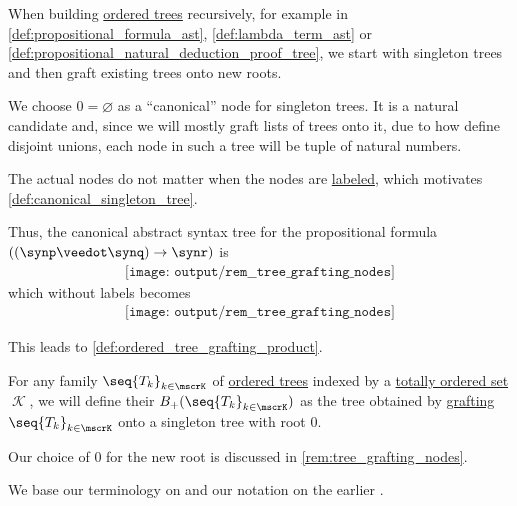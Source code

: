 \begin{remark}\label{rem:tree_grafting_nodes}
  When building \hyperref[def:ordered_tree]{ordered trees} recursively, for example in \cref{def:propositional_formula_ast}, \cref{def:lambda_term_ast} or \cref{def:propositional_natural_deduction_proof_tree}, we start with singleton trees and then graft existing trees onto new roots.

  We choose \( 0 = \varnothing \) as a \enquote{canonical} node for singleton trees. It is a natural candidate and, since we will mostly graft lists of trees onto it, due to how define disjoint unions, each node in such a tree will be tuple of natural numbers.

  The actual nodes do not matter when the nodes are \hyperref[def:labeled_set]{labeled}, which motivates \cref{def:canonical_singleton_tree}.

  Thus, the canonical abstract syntax tree for the propositional formula \( ((\synp \synvee \synq) \rightarrow \synr) \) is
  \begin{equation*}
    \begin{aligned}
      \texttt{[image: output/rem\_\_tree\_grafting\_nodes]}
    \end{aligned}
  \end{equation*}
  which without labels becomes
  \begin{equation*}
    \begin{aligned}
      \texttt{[image: output/rem\_\_tree\_grafting\_nodes]}
    \end{aligned}
  \end{equation*}

  This leads to \cref{def:ordered_tree_grafting_product}.
\end{remark}

\begin{definition}\label{def:ordered_tree_grafting_product}\mimprovised
  For any family \( \seq{ T_k }_{k \in \mscrK} \) of \hyperref[def:ordered_tree]{ordered trees} indexed by a \hyperref[def:totally_ordered_set]{totally ordered set} \( \mscrK \), we will define their  \( B_+(\seq{ T_k }_{k \in \mscrK}) \) as the tree obtained by \hyperref[def:ordered_tree_grafting]{grafting} \( \seq{ T_k }_{k \in \mscrK} \) onto a singleton tree with root \( 0 \).
\end{definition}
\begin{comments}
  \item Our choice of \( 0 \) for the new root is discussed in \cref{rem:tree_grafting_nodes}.

  \item We base our terminology on \cite[\S 3.6]{Holtkamp2011RootedTrees} and our notation on the earlier \cite[9]{Hoffman2003RootedTrees}.
\end{comments}

